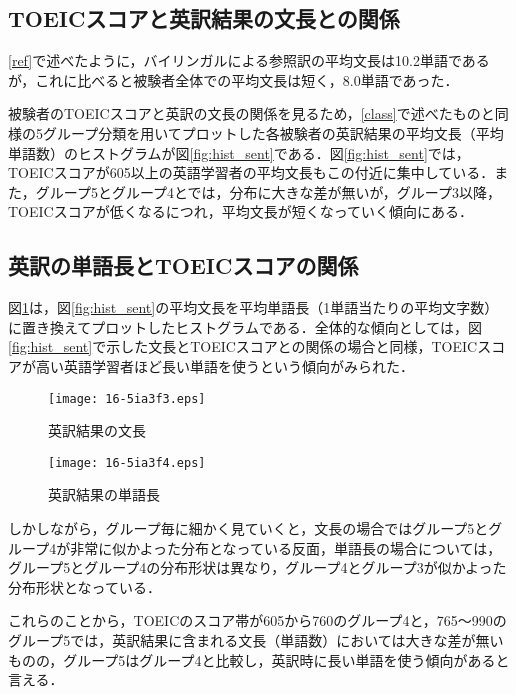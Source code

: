 \documentclass[japanese]{jnlp_1.4}
\begin{document}
\subsection{TOEICスコアと英訳結果の文長との関係}

\ref{ref}で述べたように，バイリンガルによる参照訳の平均文長は10.2単語であるが，これに比べると被験者全体での平均文長は短く，8.0単語であった．

被験者のTOEICスコアと英訳の文長の関係を見るため，\ref{class}で述べたものと同様の5グループ分類を用いてプロットした各被験者の英訳結果の平均文長（平均単語数）のヒストグラムが図\ref{fig:hist_sent}である．図\ref{fig:hist_sent}では，TOEICスコアが605以上の英語学習者の平均文長もこの付近に集中している．また，グループ5とグループ4とでは，分布に大きな差が無いが，グループ3以降，TOEICスコアが低くなるにつれ，平均文長が短くなっていく傾向にある．


\subsection{英訳の単語長とTOEICスコアの関係}

図\ref{fig:hist_word}は，図\ref{fig:hist_sent}の平均文長を平均単語長（1単語当たりの平均文字数）に置き換えてプロットしたヒストグラムである．全体的な傾向としては，図\ref{fig:hist_sent}で示した文長とTOEICスコアとの関係の場合と同様，TOEICスコアが高い英語学習者ほど長い単語を使うという傾向がみられた．

\begin{figure}[p]
\begin{center}
\texttt{[image: 16-5ia3f3.eps]}
\end{center}
\caption{英訳結果の文長}
\label{fig:hist_sent}
\vspace{1\baselineskip}

\begin{center}
\texttt{[image: 16-5ia3f4.eps]}
\end{center}
\caption{英訳結果の単語長}
\label{fig:hist_word}
\end{figure}



しかしながら，グループ毎に細かく見ていくと，文長の場合ではグループ5とグループ4が非常に似かよった分布となっている反面，単語長の場合については，グループ5とグループ4の分布形状は異なり，グループ4とグループ3が似かよった分布形状となっている．

これらのことから，TOEICのスコア帯が605から760のグループ4と，765〜990のグループ5では，英訳結果に含まれる文長（単語数）においては大きな差が無いものの，グループ5はグループ4と比較し，英訳時に長い単語を使う傾向があると言える．
\end{document}
